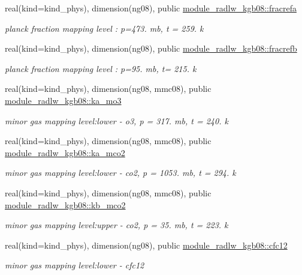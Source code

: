 \begin{Indent}
\begin{DoxyCompactItemize}
real(kind=kind\+\_\+phys), dimension(ng08), public \hyperlink{group__module__radlw__kgbnn_gad1a59ffb362cd72537df9c1916c07621}{module\+\_\+radlw\+\_\+kgb08\+::fracrefa}
\begin{DoxyCompactList}\small\item\em planck fraction mapping level \+: p=473. mb, t = 259. k \end{DoxyCompactList}\item 
real(kind=kind\+\_\+phys), dimension(ng08), public \hyperlink{group__module__radlw__kgbnn_ga0ae7e4c01034a2b95c03b041537b962e}{module\+\_\+radlw\+\_\+kgb08\+::fracrefb}
\begin{DoxyCompactList}\small\item\em planck fraction mapping level \+: p=95. mb, t= 215. k \end{DoxyCompactList}\item 
real(kind=kind\+\_\+phys), dimension(ng08, mmc08), public \hyperlink{group__module__radlw__kgbnn_ga7dec65e880c278f44419c1ae01490eae}{module\+\_\+radlw\+\_\+kgb08\+::ka\+\_\+mo3}
\begin{DoxyCompactList}\small\item\em minor gas mapping level\+:lower -\/ o3, p = 317. mb, t = 240. k \end{DoxyCompactList}\item 
real(kind=kind\+\_\+phys), dimension(ng08, mmc08), public \hyperlink{group__module__radlw__kgbnn_ga0fcd13503b3253ec6aab0aa52056f634}{module\+\_\+radlw\+\_\+kgb08\+::ka\+\_\+mco2}
\begin{DoxyCompactList}\small\item\em minor gas mapping level\+:lower -\/ co2, p = 1053. mb, t = 294. k \end{DoxyCompactList}\item 
real(kind=kind\+\_\+phys), dimension(ng08, mmc08), public \hyperlink{group__module__radlw__kgbnn_ga9a85770aee1b88b9323d9466c1772ec4}{module\+\_\+radlw\+\_\+kgb08\+::kb\+\_\+mco2}
\begin{DoxyCompactList}\small\item\em minor gas mapping level\+:upper -\/ co2, p = 35. mb, t = 223. k \end{DoxyCompactList}\item 
real(kind=kind\+\_\+phys), dimension(ng08), public \hyperlink{group__module__radlw__kgbnn_ga010239f14788bc1ed9953133e30a62fd}{module\+\_\+radlw\+\_\+kgb08\+::cfc12}
\begin{DoxyCompactList}\small\item\em minor gas mapping level\+:lower -\/ cfc12 \end{DoxyCompactList}\item 

\end{DoxyCompactItemize}
\end{Indent}
